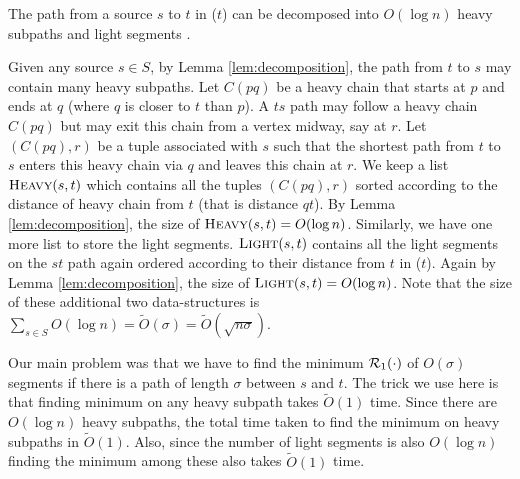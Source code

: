 \begin{lemma}
\label{lem:decomposition}
The path from a source $s$ to $t$ in \SBFS($t$) can be decomposed into $O(\log n)$ heavy subpaths
and light segments .
\end{lemma}

Given any source $s \in S$, by Lemma \ref{lem:decomposition},
the path from $t$ to $s$
may contain many heavy subpaths.
Let $C(pq)$ be a heavy
chain that starts at $p$
and ends at $q$ (where $q$ is closer to $t$ than $p$). A $ts$ path may follow
a heavy chain $C(pq)$ but may exit
this chain from a vertex midway, say at $r$. Let $(C(pq), r)$
be a tuple associated with $s$
such that the shortest path from $t$ to $s$ enters this
heavy chain via $q$ and
leaves this chain at $r$. We keep a list $\textsc{Heavy}(s,t)$
which contains
all the tuples $(C(pq), r)$ sorted according to
the distance of heavy chain
from $t$ (that is distance $qt$). By Lemma \ref{lem:decomposition},
the size
of $\textsc{Heavy}(s,t) = O(\log n)$. Similarly, we have one more
list to store the light segments.
$\textsc{Light}(s,t)$ contains all the light segments on the $st$ path
again ordered according to their
distance from $t$ in \SBFS($t$). Again by Lemma  \ref{lem:decomposition},
the size
of $\textsc{Light}(s,t) = O(\log n)$. Note that the size of these additional
two data-structures
is $\sum_{s \in S} O(\log n) = \tilde O(\sigma) = \tilde O(\sqrt{n\sigma})$.


Our main problem was that we have to find the minimum $\mathcal{R}_1(\cdot)$ of $O(\sigma)$ segments if 
there is a path of length $\sigma$ between $s$ and $t$. The trick we use here is that
finding minimum on any heavy subpath takes $\tilde O(1)$ time. Since
there are $O(\log n)$ heavy subpaths, the total time taken to find the minimum
on heavy subpaths in $\tilde O(1)$. Also, since the number of light segments is also $O(\log n)$
finding the minimum among these also takes $\tilde O(1)$ time.

